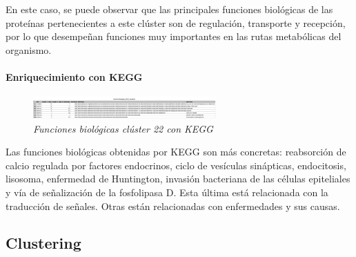 En este caso, se puede observar que las principales funciones biológicas de las proteínas pertenecientes a este clúster son de regulación, transporte y recepción, por lo que desempeñan funciones muy importantes en las rutas metabólicas del organismo. 

\paragraph{Enriquecimiento con KEGG}

\begin{figure}
	\centering
	\includegraphics[width=70mm,scale=1.2]{figures/cluster22_KEGG.png}
	\caption{\textit{Funciones biológicas clúster 22 con KEGG}}
\end{figure}

Las funciones biológicas obtenidas por KEGG son más concretas: reabsorción de calcio regulada por factores endocrinos, ciclo de vesículas sinápticas, endocitosis, lisosoma, enfermedad de Huntington, invasión bacteriana de las células epiteliales y vía de señalización de la fosfolipasa D. Esta última está relacionada con la traducción de señales. Otras están relacionadas con enfermedades y sus causas.

\subsection{Clustering}


